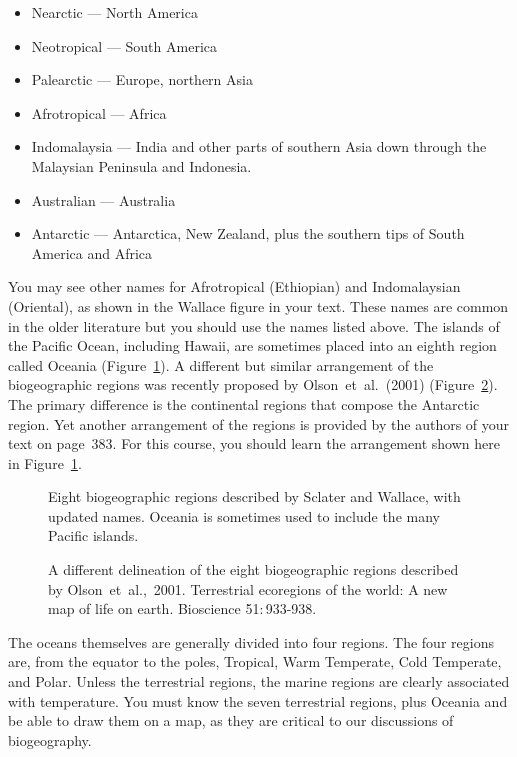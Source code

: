 \documentclass[11pt, hidelinks]{article}
\begin{document}
\begin{itemize}
\item Nearctic --- North America
\item Neotropical --- South America
\item Palearctic --- Europe, northern Asia
\item Afrotropical --- Africa
\item Indomalaysia --- India and other parts of southern Asia down through the Malaysian Peninsula and Indonesia.
\item Australian --- Australia
\item Antarctic --- Antarctica, New Zealand, plus the southern tips of South America and Africa
\end{itemize}

You may see other names for Afrotropical (Ethiopian) and Indomalaysian (Oriental), as shown in the Wallace figure in your text.  These names are common in the older literature but you should use the names listed above. The islands of the Pacific Ocean, including Hawaii, are sometimes placed into an eighth region called Oceania (Figure~\ref{biogeoregions}). A different but similar arrangement of the biogeographic regions was recently proposed by Olson~et~al.~(2001) (Figure~\ref{Olson Biogeo Regions}). The primary difference is the continental regions that compose the Antarctic region.  Yet another arrangement of the regions is provided by the authors of your text on page~383.  For this course, you should learn the arrangement shown here in Figure~\ref{biogeoregions}.

\begin{figure}[tb]
	\centering
		\caption{Eight biogeographic regions described by Sclater and Wallace, with updated names.  Oceania is sometimes used to include the many Pacific islands.\label{biogeoregions}}
		
\end{figure}

\begin{figure}[tb]
	\centering
		\caption{A different delineation of the eight biogeographic regions described by Olson~et~al.,~2001. Terrestrial ecoregions of the world: A new map of life on earth. Bioscience 51:\,933-938.\label{Olson Biogeo Regions}}
		
\end{figure}


The oceans themselves are generally divided into four regions. The four regions are, from the equator to the poles, Tropical, Warm Temperate, Cold Temperate, and Polar. Unless the terrestrial regions, the marine regions are clearly associated with temperature.  You must know the seven terrestrial regions, plus Oceania and be able to draw them on a map, as they are critical to our discussions of biogeography.
\end{document}
